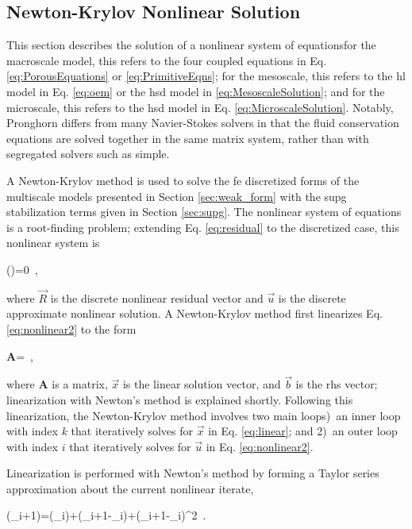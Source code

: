 \subsection{Newton-Krylov Nonlinear Solution}
\label{sec:nonlinear}

This section describes the solution of a nonlinear system of equations\mdash for the macroscale model, this refers to the four coupled equations in Eq. \eqref{eq:PorousEquations} or \eqref{eq:PrimitiveEqns}; for the mesoscale, this refers to the \gls{hl} model in Eq. \eqref{eq:oem} or the \gls{hsd} model in \eqref{eq:MesoscaleSolution}; and for the microscale, this refers to the \gls{hsd} model in Eq. \eqref{eq:MicroscaleSolution}. Notably, Pronghorn differs from many Navier-Stokes solvers in that the fluid conservation equations are solved together in the same matrix system, rather than with segregated solvers such as \gls{simple}.

A Newton-Krylov method is used to solve the \gls{fe} discretized forms of the multiscale models presented in Section \ref{sec:weak_form} with the \gls{supg} stabilization terms given in Section \ref{sec:supg}. The nonlinear system of equations is a root-finding problem; extending Eq. \eqref{eq:residual} to the discretized case, this nonlinear system is

\beq
\label{eq:nonlinear2}
()=0\ ,
\eeq

\noindent where \(\vec{R}\) is the discrete nonlinear residual vector and \(\vec{u}\) is the discrete approximate nonlinear solution. A Newton-Krylov method first linearizes Eq. \eqref{eq:nonlinear2} to the form

\beq
\label{eq:linear}
\textbf{A}=\ ,
\eeq

\noindent where \(\textbf{A}\) is a matrix, \(\vec{x}\) is the linear solution vector, and \(\vec{b}\) is the \gls{rhs} vector; linearization with Newton's method is explained shortly. Following this linearization, the Newton-Krylov method involves two main loops)~an inner loop with index \(k\) that iteratively solves for \(\vec{x}\) in Eq. \eqref{eq:linear}; and 2)~an outer loop with index \(i\) that iteratively solves for \(\vec{u}\) in Eq. \eqref{eq:nonlinear2}.

Linearization is performed with Newton's method by forming a Taylor series approximation about the current nonlinear iterate,

\beq
\label{eq:TaylorSeriesResidual}
(_{i+1})=(_i)+(_{i+1}-_i)+(_{i+1}-_i)^2\ .
\eeq

